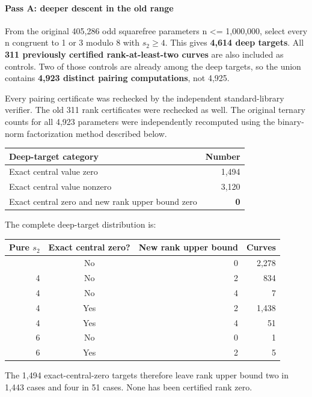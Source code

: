 \documentclass[11pt]{article}
\begin{document}
\paragraph{Pass A: deeper descent in the old range}

From the original 405,286 odd squarefree parameters n \textless= 1,000,000, select every n congruent to 1 or 3 modulo 8 with \(s_2\ge4\). This gives \textbf{4,614 deep targets}. All \textbf{311 previously certified rank-at-least-two curves} are also included as controls. Two of those controls are already among the deep targets, so the union contains \textbf{4,923 distinct pairing computations}, not 4,925.

Every pairing certificate was rechecked by the independent standard-library verifier. The old 311 rank certificates were rechecked as well. The original ternary counts for all 4,923 parameters were independently recomputed using the binary-norm factorization method described below.

\begingroup\small\setlength{\tabcolsep}{4pt}
\begin{longtable}[]{@{}lr@{}}
\toprule\noalign{}
Deep-target category & Number \\
\midrule\noalign{}
\endhead
\bottomrule\noalign{}
\endlastfoot
Exact central value zero & 1,494 \\
Exact central value nonzero & 3,120 \\
Exact central zero and new rank upper bound zero & \textbf{0} \\
\end{longtable}
\endgroup

The complete deep-target distribution is:

\begingroup\small\setlength{\tabcolsep}{4pt}
\begin{longtable}[]{@{}rcrr@{}}
\toprule\noalign{}
Pure \(s_2\) & Exact central zero? & New rank upper bound & Curves \\
\midrule\noalign{}
\endhead
\bottomrule\noalign{}
\endlastfoot
4 & No & 0 & 2,278 \\
4 & No & 2 & 834 \\
4 & No & 4 & 7 \\
4 & Yes & 2 & 1,438 \\
4 & Yes & 4 & 51 \\
6 & No & 0 & 1 \\
6 & Yes & 2 & 5 \\
\end{longtable}
\endgroup

The 1,494 exact-central-zero targets therefore leave rank upper bound two in 1,443 cases and four in 51 cases. None has been certified rank zero.
\end{document}
